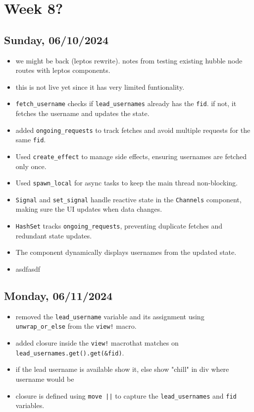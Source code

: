 \newpage
\section{Week 8?}
\subsection*{Sunday, 06/10/2024}
\begin{itemize}
    \item we might be back (leptos rewrite). notes from testing existing hubble
        node routes with leptos components.
    \item this is not live yet since it has very limited funtionality.
    \item \texttt{fetch_username} checks if \texttt{lead_usernames} already 
        has the \texttt{fid}. if not, it fetches the username and updates the 
        state.
    \item added \texttt{ongoing_requests} to track fetches and avoid multiple 
        requests for the same \texttt{fid}.
    \item Used \texttt{create_effect} to manage side effects, ensuring 
        usernames are fetched only once.
    \item Used \texttt{spawn_local} for async tasks to keep the main thread 
        non-blocking.
    \item \texttt{Signal} and \texttt{set_signal} handle reactive state in the 
        \texttt{Channels} component, making sure the UI updates when data 
        changes.
    \item \texttt{HashSet} tracks \texttt{ongoing_requests}, preventing 
        duplicate fetches and redundant state updates.
    \item The component dynamically displays usernames from the updated state.
    \item asdfasdf
\end{itemize}

\subsection*{Monday, 06/11/2024}
\begin{itemize}
    \item removed the \texttt{lead_username} variable and its assignment using 
        \texttt{unwrap_or_else} from the \texttt{view!} macro.
    \item added closure inside the \texttt{view!} macrothat matches on 
        \texttt{lead_usernames.get().get(&fid)}.
    \item if the lead username is available show it, else show "chill" in div
        where username would be 
    \item closure is defined using \texttt{move ||} to capture the 
        \texttt{lead_usernames} and \texttt{fid} variables.
\end{itemize}

